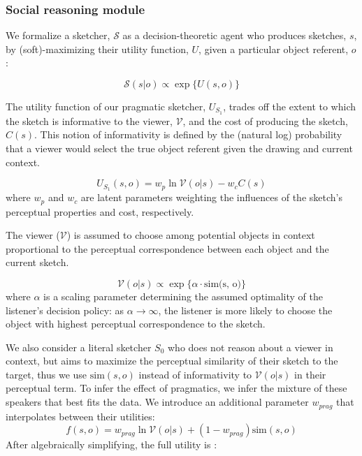\documentclass[9pt,twocolumn,twoside]{pnas-new}
\begin{document}
{\subsubsection*{Social reasoning module}

We formalize a sketcher, $\mathcal{S}$ as a decision-theoretic agent who produces sketches, $s$, by (soft)-maximizing their utility function, $U$, given a particular object referent, $o$:

\begin{equation}
\mathcal{S}(s|o) \propto \exp\{{U(s,o)\}}
\end{equation}

The utility function of our pragmatic sketcher, $U_{S_1}$,  trades off the extent to which the sketch is informative to the viewer, $\mathcal{V}$, and the cost of producing the sketch, $C(s)$. This notion of informativity is defined by the (natural log) probability that a viewer would select the true object referent given the drawing and current context.

\begin{equation} \label{sketcher_utility}
U_{S_1}(s, o) = w_p \ln \mathcal{V}(o|s) - w_c C(s)
\end{equation}
where $w_p$ and $w_c$ are latent parameters weighting the influences of the sketch's perceptual properties and cost, respectively.

The viewer ($\mathcal{V}$) is assumed to choose among potential objects in context proportional to the perceptual correspondence between each object and the current sketch.

\begin{equation} \label{literal_viewer_score}
\mathcal{V}(o|s) \propto \exp\{\alpha \cdot \textrm{sim(s, o)}\}
\end{equation}
where $\alpha$ is a scaling parameter determining the assumed optimality of the listener's decision policy: as $\alpha \rightarrow \infty$, the listener is more likely to choose the object with highest perceptual correspondence to the sketch.

We also consider a literal sketcher $S_0$ who does not reason about a viewer in context, but aims to maximize the perceptual similarity of their sketch to the target, thus we use $\textrm{sim}(s, o)$ instead of informativity to $\mathcal{V}(o|s)$ in their perceptual term. To infer the effect of pragmatics, we infer the mixture of these speakers that best fits the data. We introduce an additional parameter $w_{prag}$ that interpolates between their utilities: $$f(s,o) = w_{prag}\ln \mathcal{V}(o | s) + (1-w_{prag}) \textrm{sim}(s,o)$$ After algebraically simplifying, the full utility is :

}
\end{document}
